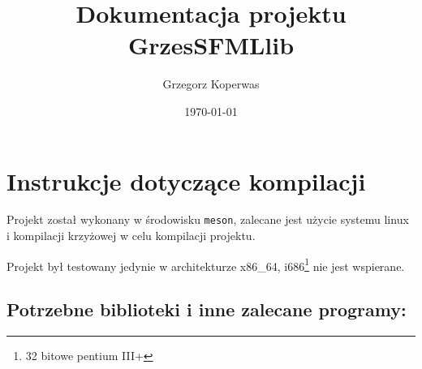 \documentclass[a4paper,11pt]{article}
\title{Dokumentacja projektu GrzesSFMLlib}
\author{Grzegorz Koperwas}
\date{\today}
\begin{document}
\thispagestyle{empty}
\begin{minipage}{\textwidth}
\vspace{2cm}
\begin{flushright}
    \LARGE{\textbf{\thetitle}}

    \vspace{1cm}

    \Large{\theauthor}

    \makeatletter
    \@date
    \makeatother
\end{flushright}
\end{minipage}

\vspace{4cm}

\tableofcontents

\section{Instrukcje dotyczące kompilacji}

Projekt został wykonany w środowisku \texttt{meson}, zalecane jest użycie systemu linux i kompilacji krzyżowej w celu kompilacji projektu.

Projekt był testowany jedynie w architekturze x86\_64, i686\footnote{32 bitowe pentium III+} nie jest wspierane.


\subsection*{Potrzebne biblioteki i inne zalecane programy:}
\end{document}
